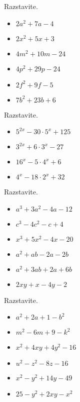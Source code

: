             \begin{naloga}
                Razstavite.
                \begin{itemize}
                    \item $2a^2+7a-4$ 
                    \item $2x^2+5x+3$ 
                    \item $4m^2+10m-24$ 
                    \item $4p^2+29p-24$ 
                    \item $2f^2+9f-5$ 
                    \item $7b^2+23b+6$ 
                \end{itemize}
            \end{naloga}
        
    
        
            \begin{naloga}
                Razstavite.
                \begin{itemize}
                    \item $5^{2x}-30\cdot 5^x+125$ 
                    \item $3^{2x}+6\cdot 3^x-27$ 
                    \item $16^x-5\cdot 4^x+6$ 
                    \item $4^x-18\cdot 2^x+32$ 
                \end{itemize}
            \end{naloga}
        
    
        
            \begin{naloga}
                Razstavite.
                \begin{itemize}
                    \item $a^3+3a^2-4a-12$ 
                    \item $c^3-4c^2-c+4$ 
                    \item $x^3+5x^2-4x-20$ 
                    \item $a^2+ab-2a-2b$ 
                    \item $a^2+3ab+2a+6b$ 
                    \item $2xy+x-4y-2$ 
                \end{itemize}
            \end{naloga}
        
    
        
            \begin{naloga}
                Razstavite.
                \begin{itemize}
                    \item $a^2+2a+1-b^2$ 
                    \item $m^2-6m+9-k^2$ 
                    \item $x^2+4xy+4y^2-16$ 
                    \item $u^2-z^2-8z-16$ 
                    \item $x^2-y^2+14y-49$ 
                    \item $25-y^2+2xy-x^2$ 
                \end{itemize}
            \end{naloga}
        
